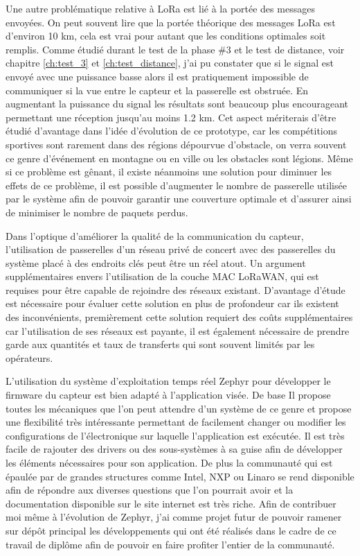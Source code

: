Une autre problématique relative à LoRa est lié à la portée des messages envoyées. On peut souvent lire que la portée théorique des messages LoRa est d'environ 10 km, cela est vrai pour autant que les conditions optimales soit remplis. Comme étudié durant le test de la phase \#3 et le test de distance, voir chapitre \ref{ch:test_3} et \ref{ch:test_distance}, j'ai pu constater que si le signal est envoyé avec une puissance basse alors il est pratiquement impossible de communiquer si la vue entre le capteur et la passerelle est obstruée. En augmentant la puissance du signal les résultats sont beaucoup plus encourageant permettant une réception jusqu'au moins 1.2 km. Cet aspect mériterais d'être étudié d'avantage dans l'idée d'évolution de ce prototype, car les compétitions sportives sont rarement dans des régions dépourvue d'obstacle, on verra souvent ce genre d'événement en montagne ou en ville ou les obstacles sont légions. Même si ce problème est gênant, il existe néanmoins une solution pour diminuer les effets de ce problème, il est possible d'augmenter le nombre de passerelle utilisée par le système afin de pouvoir garantir une couverture optimale et d'assurer ainsi de minimiser le nombre de paquets perdus. 

Dans l'optique d'améliorer la qualité de la communication du capteur, l'utilisation de passerelles d'un réseau privé de concert avec des passerelles du système placé à des endroits clés peut être un réel atout. Un argument supplémentaires envers l'utilisation de la couche MAC LoRaWAN, qui est requises pour être capable de rejoindre des réseaux existant. D'avantage d'étude est nécessaire pour évaluer cette solution en plus de profondeur car ils existent des inconvénients, premièrement cette solution requiert des coûts supplémentaires car l'utilisation de ses réseaux est payante, il est également nécessaire de prendre garde aux quantités et taux de transferts qui sont souvent limités par les opérateurs.

L'utilisation du système d'exploitation temps réel Zephyr pour développer le firmware du capteur est bien adapté à l'application visée. De base Il propose toutes les mécaniques que l'on peut attendre d'un système de ce genre et propose une flexibilité très intéressante permettant de facilement changer ou modifier les configurations de l'électronique sur laquelle l'application est exécutée. Il est très facile de rajouter des drivers ou des sous-systèmes à sa guise afin de développer les éléments nécessaires pour son application. De plus la communauté qui est épaulée par de grandes structures comme Intel, NXP ou Linaro se rend disponible afin de répondre aux diverses questions que l'on pourrait avoir et la documentation disponible sur le site internet est très riche. Afin de contribuer moi même à l'évolution de Zephyr, j'ai comme projet futur de pouvoir ramener sur dépôt principal les développements qui ont été réalisés dans le cadre de ce travail de diplôme afin de pouvoir en faire profiter l'entier de la communauté.

